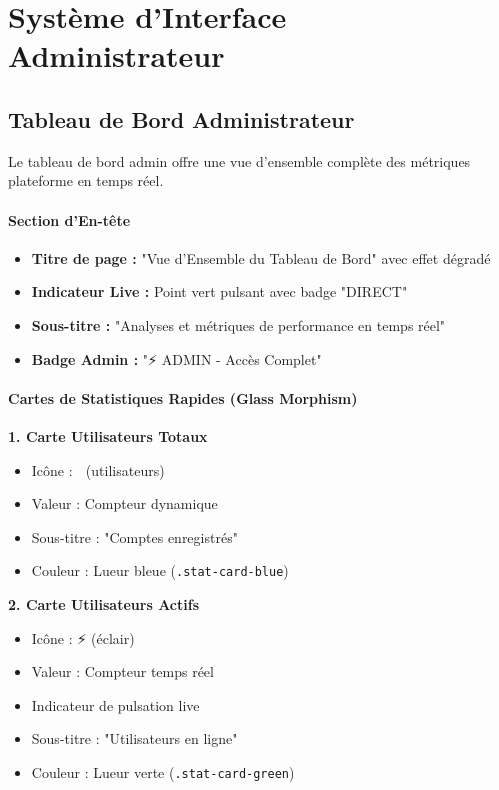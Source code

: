 \documentclass[12pt, a4paper]{report}
\begin{document}
\section{Système d'Interface Administrateur}

\subsection{Tableau de Bord Administrateur}

Le tableau de bord admin offre une vue d'ensemble complète des métriques plateforme en temps réel.

\paragraph{Section d'En-tête}
\begin{itemize}
    \item \textbf{Titre de page :} "Vue d'Ensemble du Tableau de Bord" avec effet dégradé
    \item \textbf{Indicateur Live :} Point vert pulsant avec badge "DIRECT"
    \item \textbf{Sous-titre :} "Analyses et métriques de performance en temps réel"
    \item \textbf{Badge Admin :} "⚡ ADMIN - Accès Complet"
\end{itemize}

\paragraph{Cartes de Statistiques Rapides (Glass Morphism)}

\textbf{1. Carte Utilisateurs Totaux}
\begin{itemize}
    \item Icône : 👥 (utilisateurs)
    \item Valeur : Compteur dynamique
    \item Sous-titre : "Comptes enregistrés"
    \item Couleur : Lueur bleue (\texttt{.stat-card-blue})
\end{itemize}

\textbf{2. Carte Utilisateurs Actifs}
\begin{itemize}
    \item Icône : ⚡ (éclair)
    \item Valeur : Compteur temps réel
    \item Indicateur de pulsation live
    \item Sous-titre : "Utilisateurs en ligne"
    \item Couleur : Lueur verte (\texttt{.stat-card-green})
\end{itemize}
\end{document}
